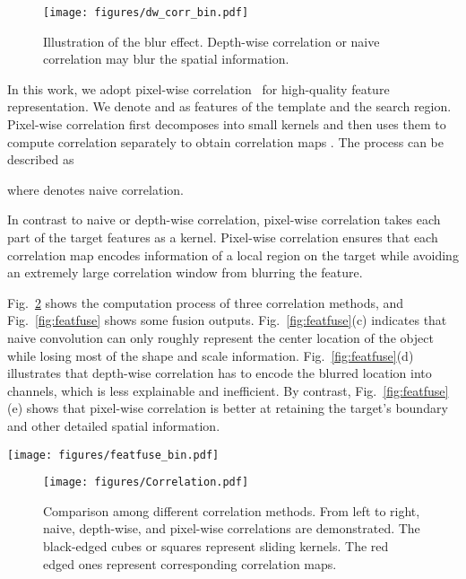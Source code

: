 \documentclass[final]{cvpr}
\begin{document}
\begin{figure}
\centering
    \texttt{[image: figures/dw\_corr\_bin.pdf]}
    \caption{Illustration of the blur effect. Depth-wise correlation or naive correlation may blur the spatial information.} \label{fig:dwcorr_blur}
    \vspace{-3mm}
\end{figure}

In this work, we adopt pixel-wise correlation~\cite{RANet} for high-quality feature representation. 
We denote  and  
as features of the template and the search region. 
Pixel-wise correlation first decomposes  into  small kernels 
 and then uses them to compute correlation 
separately to obtain correlation maps . 
The process can be described as

where  denotes naive correlation.

In contrast to naive or depth-wise correlation, pixel-wise correlation takes each part of the target features as a kernel. 
Pixel-wise correlation ensures that each correlation map encodes information of a local region on the target 
while avoiding an extremely large correlation window from blurring the feature. 

Fig.~\ref{fig-corr-NL} shows the computation process of three correlation methods, 
and Fig.~\ref{fig:featfuse} shows some fusion outputs.
Fig.~\ref{fig:featfuse}(c) indicates that naive convolution can only roughly represent the center location 
of the object while losing most of the shape and scale information. 
Fig.~\ref{fig:featfuse}(d) illustrates that depth-wise correlation has to encode the blurred location into channels, 
which is less explainable and inefficient. 
By contrast, Fig.~\ref{fig:featfuse}(e) shows that pixel-wise correlation is better at retaining the target's 
boundary and other detailed spatial information. 

\begin{figure*}
    \texttt{[image: figures/featfuse\_bin.pdf]}
    \caption{Comparison among different correlation responses. (a) and (b) denote the reference branch and 
    the test branch, respectively. (c), (d), and (e) are correlation result of naive, depth-wise (the first 32 channels of 256), and pixel-wise correlations, respectively.} \label{fig:featfuse}
\end{figure*}


\begin{figure}
    \texttt{[image: figures/Correlation.pdf]}
    \caption{Comparison among different correlation methods. From left to right, naive,
depth-wise, and pixel-wise correlations are demonstrated.
The black-edged cubes or squares represent sliding kernels. The
red edged ones represent corresponding correlation maps.} \label{fig-corr-NL}
\end{figure}
\end{document}
